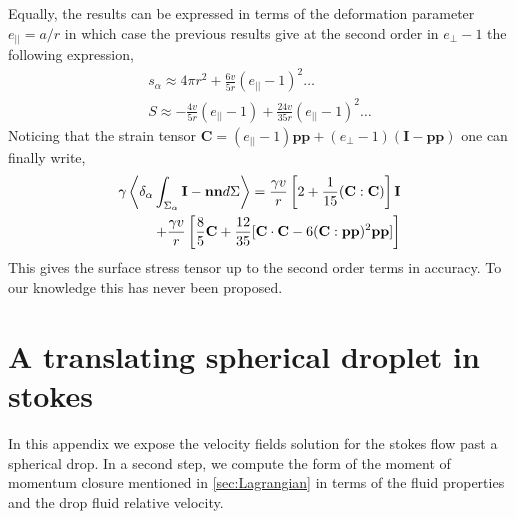 Equally, the results can be expressed in terms of the deformation parameter $e_{||} = a/r$ in which case the previous results give at the second order in $e_\bot-1$ the following expression, 
\begin{align*}
    s_\alpha 
    \approx 4 \pi r^2 + \frac{6 v }{5 r} (e_{||}-1)^2 \ldots\\
    S 
    \approx 
    - \frac{4 v}{5 r}(e_{||}-1) + \frac{24 v }{35r}(e_{||}-1)^2 \ldots
\end{align*}
Noticing that the strain tensor $\textbf{C} = (e_{||}-1) \textbf{pp} + (e_\bot-1)(\textbf{I}- \textbf{pp})$ one can finally write,
\begin{align*}
    \gamma\left<\delta_\alpha \int_{\Sigma_\alpha} \textbf{I}-\textbf{nn} d\Sigma\right>
    = \frac{\gamma v}{r} \left[
        2  + \frac{1 }{15 } (\textbf{C}:\textbf{C})\right] \textbf{I}\\
        + \frac{\gamma v}{r} \left[ \frac{8}{5} \textbf{C}
        + \frac{12}{35}[\textbf{C}\cdot \textbf{C}- 6 (\textbf{C}:\textbf{pp})^2\textbf{pp}]
        \right]
\end{align*}
This gives the surface stress tensor up to the second order terms in accuracy. 
To our knowledge this has never been proposed. 

\section{A translating spherical droplet in stokes}
\label{ap:Translating_sphere}
In this appendix we expose the velocity fields solution for the stokes flow past a spherical drop. 
In a second step, we compute the form of the moment of momentum closure mentioned in \ref{sec:Lagrangian} in terms of the fluid properties and the drop fluid relative velocity.

